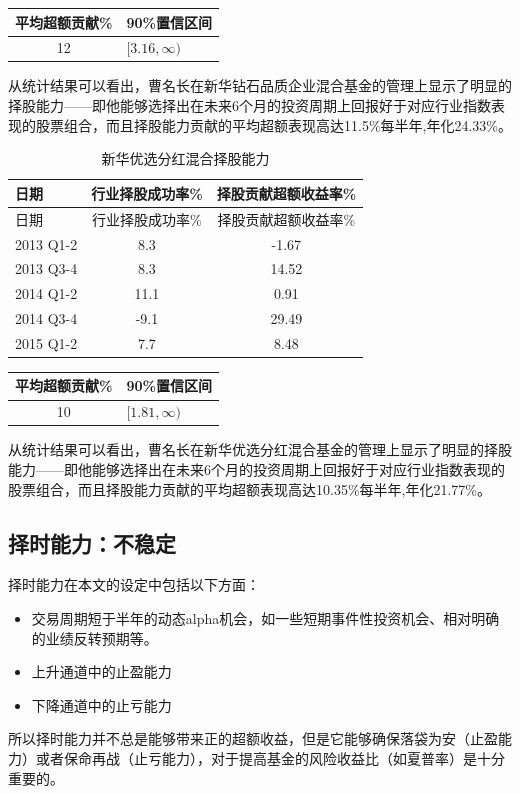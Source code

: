 \documentclass[hyperref,]{ctexart}
\providecommand{\tightlist}{%
  \setlength{\itemsep}{0pt}\setlength{\parskip}{0pt}}
\begin{document}
\begin{longtable}[]{@{}cl@{}}
\toprule
平均超额贡献\% & 90\%置信区间\tabularnewline
\midrule
\endhead
12 & \([3.16,\infty)\)\tabularnewline
\bottomrule
\end{longtable}

从统计结果可以看出，曹名长在新华钻石品质企业混合基金的管理上显示了明显的择股能力------即他能够选择出在未来6个月的投资周期上回报好于对应行业指数表现的股票组合，而且择股能力贡献的平均超额表现高达11.5\%每半年,年化24.33\%。

\begin{longtable}[]{@{}lcc@{}}
\caption{新华优选分红混合择股能力}\tabularnewline
\toprule
日期 & 行业择股成功率\% & 择股贡献超额收益率\%\tabularnewline
\midrule
\endfirsthead
\toprule
日期 & 行业择股成功率\% & 择股贡献超额收益率\%\tabularnewline
\midrule
\endhead
2013 Q1-2 & 8.3 & -1.67\tabularnewline
2013 Q3-4 & 8.3 & 14.52\tabularnewline
2014 Q1-2 & 11.1 & 0.91\tabularnewline
2014 Q3-4 & -9.1 & 29.49\tabularnewline
2015 Q1-2 & 7.7 & 8.48\tabularnewline
\bottomrule
\end{longtable}

\begin{longtable}[]{@{}cl@{}}
\toprule
平均超额贡献\% & 90\%置信区间\tabularnewline
\midrule
\endhead
10 & \([1.81,\infty)\)\tabularnewline
\bottomrule
\end{longtable}

从统计结果可以看出，曹名长在新华优选分红混合基金的管理上显示了明显的择股能力------即他能够选择出在未来6个月的投资周期上回报好于对应行业指数表现的股票组合，而且择股能力贡献的平均超额表现高达10.35\%每半年,年化21.77\%。

\subsection{择时能力：不稳定}

择时能力在本文的设定中包括以下方面：

\begin{itemize}
\tightlist
\item
  交易周期短于半年的动态alpha机会，如一些短期事件性投资机会、相对明确的业绩反转预期等。
\item
  上升通道中的止盈能力
\item
  下降通道中的止亏能力
\end{itemize}

所以择时能力并不总是能够带来正的超额收益，但是它能够确保落袋为安（止盈能力）或者保命再战（止亏能力），对于提高基金的风险收益比（如夏普率）是十分重要的。
\end{document}
